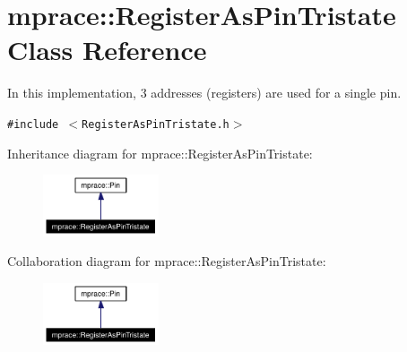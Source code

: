 \hypertarget{classmprace_1_1RegisterAsPinTristate}{
\section{mprace::Register\-As\-Pin\-Tristate Class Reference}
\label{classmprace_1_1RegisterAsPinTristate}
}
In this implementation, 3 addresses (registers) are used for a single pin.  


{\tt \#include $<$Register\-As\-Pin\-Tristate.h$>$}

Inheritance diagram for mprace::Register\-As\-Pin\-Tristate:\begin{figure}[H]
\begin{center}
\leavevmode
\includegraphics[width=97pt]{classmprace_1_1RegisterAsPinTristate__inherit__graph}
\end{center}
\end{figure}
Collaboration diagram for mprace::Register\-As\-Pin\-Tristate:\begin{figure}[H]
\begin{center}
\leavevmode
\includegraphics[width=97pt]{classmprace_1_1RegisterAsPinTristate__coll__graph}
\end{center}
\end{figure}

